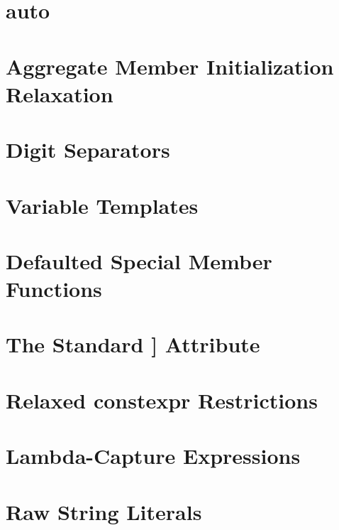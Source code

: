 \newpage
\section[{\ttfamily auto}]{{\SecCode auto}}\label{auto}




\newpage
\section[Aggregate Member Initialization Relaxation]{Aggregate Member Initialization Relaxation}\label{aggregate-member-initialization-relaxation}
\renewcommand{\cppxx}{C++14}%


\newpage
\section[Digit Separators]{Digit Separators}
\label{digitseparator} %
\label{digit-separators} %


\newpage
\section[Variable Templates]{Variable Templates}
\label{variable-templates}


\newpage
\section[Defaulted Special Member Functions]{Defaulted Special Member Functions}\label{Defaulted-Special-Member-Functions}\label{defaulted-special-member-functions}


\newpage
\section[{\tt [[deprecated]]}]{The Standard {\SecCode [[deprecated]]} Attribute\sectionmark{{\RHCode [[deprecated]]}}}\label{deprecated}\label{the-standard-[[deprecated]]-attribute}\sectionmark{{\RHCode [[deprecated]]}}


\newpage
\section[Relaxed {\ttfamily constexpr} Restrictions]{Relaxed {\SecCode constexpr} Restrictions}\label{relaxed-constexpr-restrictions}


\newpage
\section[Lambda-Capture Expressions]{Lambda-Capture Expressions}\label{lambda-capture-expressions}


\newpage
\section[Raw String Literals]{Raw String Literals}\label{raw-string-literals}




